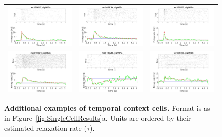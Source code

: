 \documentclass{apa}
\begin{document}
\begin{figure}
\begin{tabular}{l l l}
\includegraphics[width =.33\textwidth]{Supplemental_Cells/allcell_209_v_11.jpeg} %
&
\includegraphics[width =.33\textwidth]{Supplemental_Cells/allcell_252_v_11.jpeg} %
&
\includegraphics[width =.33\textwidth]{Supplemental_Cells/allcell_137_v_11.jpeg}\\ %


\includegraphics[width =.33\textwidth]{Supplemental_Cells/allcell_289_v_11.jpeg} %
&
\includegraphics[width =.33\textwidth]{Supplemental_Cells/allcell_330_v_11.jpeg} %
&
\includegraphics[width =.33\textwidth]{Supplemental_Cells/allcell_123_v_11.jpeg}\\%



\end{tabular}

\caption{ \textbf{Additional examples of temporal context cells.} Format is as
in Figure~\ref{fig:SingleCellResults}a.  Units are ordered by their
estimated relaxation rate ($\tau$).
\label{fig:MoreTCC} 
} 
\end{figure}
\end{document}
